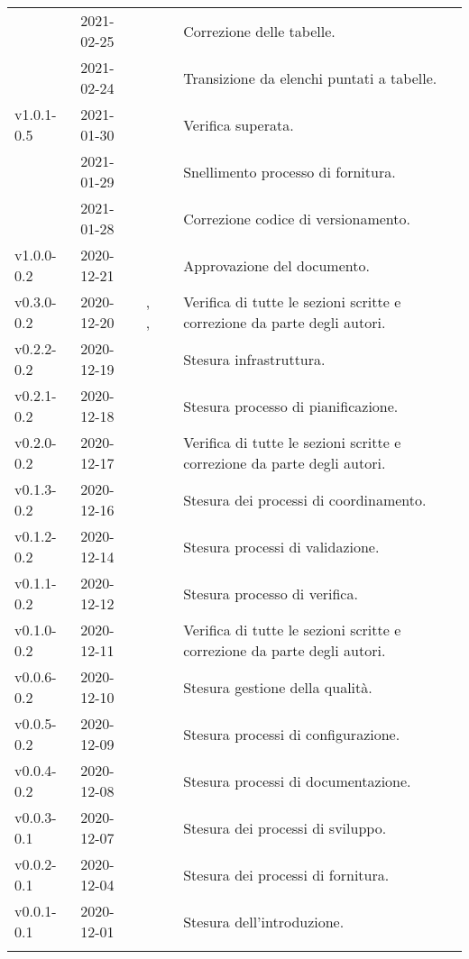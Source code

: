{\begin{longtable}{C{.131777\freewidth} C{.134036\freewidth} C{.263554\freewidth} C{.188254\freewidth} C{.282379\freewidth}}
		 & 2021-02-25 & \Giosue{} & \ana{} & Correzione delle tabelle. \\
		  & 2021-02-24 & \Lucrezia{} & \ana{} & Transizione da elenchi puntati a tabelle. \\ 
		 v1.0.1-0.5 & 2021-01-30 & \Daniele{} & \ver{} &  Verifica superata. \\
		 & 2021-01-29 & \Lucrezia{} & \ana{} & Snellimento processo di fornitura. \\
		 & 2021-01-28 & \Lucrezia{} & \ana{} & Correzione codice di versionamento. \\
        v1.0.0-0.2 & 2020-12-21 & \Daniele{} & \RdP{} & Approvazione del documento. \\
        
        v0.3.0-0.2 & 2020-12-20 & \Giosue{}, \Matteo{}, \Tommaso{} & \vers{} & Verifica di tutte le sezioni scritte e correzione da parte degli autori. \\ 
        v0.2.2-0.2 & 2020-12-19 & \Lucrezia{} & \ana{} & Stesura infrastruttura. \\
        v0.2.1-0.2 & 2020-12-18 & \Davide{} & \ana{} & Stesura processo di pianificazione. \\ 
		
		v0.2.0-0.2 & 2020-12-17 & \Giosue{} & \ver{} & Verifica di tutte le sezioni scritte e correzione da parte degli autori. \\ 
		v0.1.3-0.2 & 2020-12-16 & \Lucrezia{} & \ana{} & Stesura dei processi di coordinamento. \\ 
		v0.1.2-0.2 & 2020-12-14 & \Davide{} & \ana{} & Stesura processi di validazione. \\ 
		v0.1.1-0.2 & 2020-12-12 & \Francesco{} & \ana{} & Stesura processo di verifica. \\ 		
		
		v0.1.0-0.2 & 2020-12-11 & \Matteo{} &  \ver{} & Verifica di tutte le sezioni scritte e correzione da parte degli autori. \\
		v0.0.6-0.2 & 2020-12-10 & \Davide{} &  \ana{} & Stesura gestione della qualità. \\
		v0.0.5-0.2 & 2020-12-09 & \Francesco{} &  \ana{} & Stesura processi di configurazione. \\
		v0.0.4-0.2 & 2020-12-08 & \Lucrezia{} &  \ana{} & Stesura processi di documentazione. \\
		
		
		v0.0.3-0.1 & 2020-12-07 & \Francesco{} &  \ana{} & Stesura dei processi di sviluppo. \\
		v0.0.2-0.1 & 2020-12-04 & \Davide{} &  \ana{} & Stesura dei processi di fornitura. \\
		v0.0.1-0.1 & 2020-12-01 & \Lucrezia{} &  \ana{} & Stesura dell'introduzione. \\


		\bottomrule
		\hiderowcolors
	\end{longtable}
}